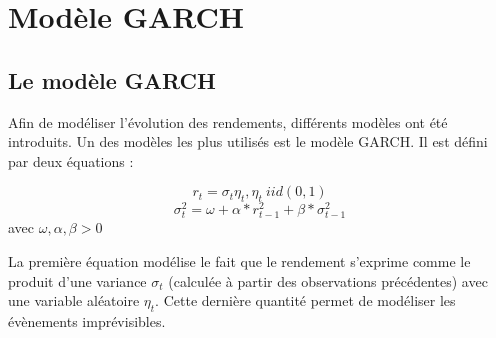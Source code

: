 	\section{Modèle GARCH}





		\subsection{Le modèle GARCH}
		\label{subsubsection:modele-garch}
			Afin de modéliser l'évolution des rendements, différents modèles ont été introduits. Un des modèles les plus utilisés est le modèle GARCH.
			Il est défini par deux équations :

			\[r_t = \sigma_t\eta_t , \eta_t~iid(0,1)\]
			\[\sigma_t^2 = \omega+\alpha*r_{t-1}^2+\beta*\sigma_{t-1}^2\] avec $\omega, \alpha, \beta > 0$

			La première équation modélise le fait que le rendement s'exprime comme le produit d'une variance $\sigma_t$ (calculée à partir des observations précédentes) avec une variable aléatoire $\eta_t$. Cette dernière quantité permet de modéliser les évènements imprévisibles.

